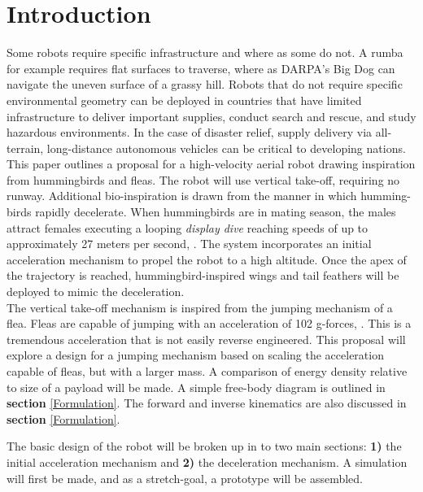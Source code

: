 \section{Introduction}
\label{intro}

\indent Some robots require specific infrastructure and where as some do not. A rumba for example requires flat surfaces to traverse, where as DARPA's Big Dog can navigate the uneven surface of a grassy hill. Robots that do not require specific environmental geometry can be deployed in countries that have limited infrastructure to deliver important supplies, conduct search and rescue, and study hazardous environments. In the case of disaster relief, supply delivery via all-terrain, long-distance autonomous vehicles can be critical to developing nations.\\

\indent This paper outlines a proposal for a high-velocity aerial robot drawing
inspiration from hummingbirds and fleas. The robot will use vertical take-off, requiring no runway. Additional bio-inspiration is drawn from the manner in which humming-birds rapidly decelerate. When hummingbirds are in mating season, the males attract females executing a looping \textit{display dive} reaching speeds of up to approximately 27 meters per second, \cite{bennet-clark_jump_nodate}. The system incorporates an initial acceleration mechanism to propel the robot to a high altitude. Once the apex of the trajectory is reached, hummingbird-inspired wings and tail feathers will be deployed to mimic the deceleration.\\

\indent The vertical take-off mechanism is inspired from the jumping mechanism of a flea. Fleas are capable of jumping with an acceleration of 102 g-forces, \cite[p.~62]{bennet-clark_jump_nodate}. This is a tremendous acceleration that is not easily reverse engineered. This proposal will explore a design for a jumping mechanism based on scaling the acceleration capable of fleas, but with a larger mass. A comparison of energy density relative to size of a payload will be made. A simple free-body diagram is outlined in \textbf{section} \ref{Formulation}. The forward and inverse kinematics are also discussed in \textbf{section} \ref{Formulation}.\\

\indent  

\indent The basic design of the robot will be broken up in to two main sections: \textbf{1)} the initial acceleration mechanism and \textbf{2)} the deceleration mechanism. A simulation will first be made, and as a stretch-goal, a prototype will be assembled.\\